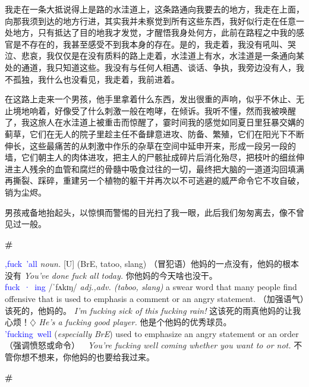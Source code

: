 \documentclass{ctexbook}
\begin{document}
    我走在一条大抵说得上是路的水洼道上，这条路通向我要去的地方，我走在上面，向那我须到达的地方行进，其实我并未察觉到所有这些东西，我好似行走在任意一处地方，只有抵达了目的地我才发觉，才醒悟我身处何方，此前在路程之中我的感官是不存在的，我甚至感受不到我本身的存在。是的，我走着，我没有吼叫、哭泣、悲哀，我仅仅是在没有质料的路上走着，水洼道上有水，水洼道是一条通向某处的通道，我只知道这些。我没有与任何人相遇、谈话、争执，我旁边没有人，我不孤独，我什么也没看见，我走着，我前进着。

    在这路上走来一个男孩，他手里拿着什么东西，发出很重的声响，似乎不休止、无止境地响着，好像受了什么刺激一般在咆哮，在倾诉。我听不懂，然而我被唤醒了，我这旅人在水洼道上被重击而惊醒了，霎时间我的感觉如同夏日里狂暴交媾的蓟草，它们在无人的院子里趁主任不备肆意进攻、防备、繁殖，它们在阳光下不断伸长，这些最痛苦的从刺激中作乐的杂草在空间中延申开来，形成一段另一段的墙，它们朝主人的肉体进攻，把主人的尸骸扯成碎片后消化殆尽，把枝叶的细丝伸进主人残余的血管和腐烂的骨髓中吸食过往的一切，最终把大脑的一道道沟回填满再撕裂、踩碎，重建另一个植物的躯干并再次以不可逃避的威严命令它不攻自破，销为尘烬。

    男孩戒备地抬起头，以惊惧而警惕的目光扫了我一眼，此后我们匆匆离去，像不曾见过一般。

\newpage
\textbf{\#}


\mbox


    \textcolor{blue}{\textsf{,fuck 'all}} {\normalsize \textsf{\emph{noun.}}} \textsf{[U] (BrE, tatoo, slang)} （冒犯语）他妈的一点没有，他妈的根本没有 \emph{You've done fuck all today.} 你他妈的今天啥也没干。
    \\


    \mbox

    
    \textcolor{blue}{\textsf{fuck\!\!\!\! · \!\!\!\! ing}} /ˈfʌkɪŋ/ {\normalsize \textsf{\emph{adj.,adv. (taboo, slang)}}} a swear word that many people find offensive that is used to emphasis a comment or an angry statement. （加强语气）该死的，他妈的。 \emph{I'm fucking sick of this fucking rain!} 这该死的雨真他妈的让我心烦！{$\diamondsuit$} \emph{He's a fucking good player.} 他是个他妈的优秀球员。
    \\


    \mbox

    
    \textcolor{blue}{\textsf{'fucking well}} (\emph{\textsf{especially BrE}}) used to emphasize an angry statement or an order （强调愤怒或命令）\ \ \emph{You're fucking well coming whether you want to or not.} 不管你想不想来，你他妈的也要给我过来。

\newpage
\textbf{\#}
\end{document}

